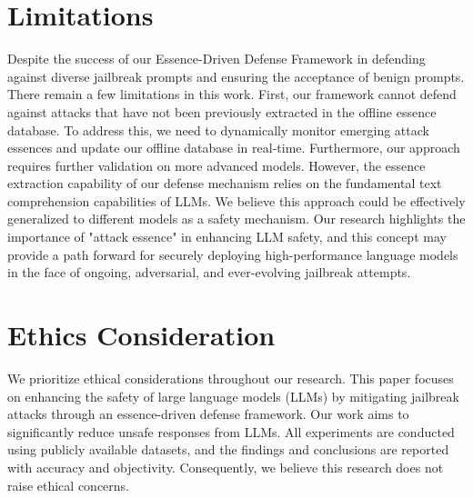 \newpage

\section*{Limitations}
Despite the success of our Essence-Driven Defense Framework in defending against diverse jailbreak prompts and ensuring the acceptance of benign prompts. There remain a few limitations in this work. First, our framework cannot defend against attacks that have not been previously extracted in the offline essence database. To address this, we need to dynamically monitor emerging attack essences and update our offline database in real-time. Furthermore, our approach requires further validation on more advanced models. However, the essence extraction capability of our defense mechanism relies on the fundamental text comprehension capabilities of LLMs. We believe this approach could be effectively generalized to different models as a safety mechanism. Our research highlights the importance of "attack essence" in enhancing LLM safety, and this concept may provide a path forward for securely deploying high-performance language models in the face of ongoing, adversarial, and ever-evolving jailbreak attempts.

\section*{Ethics Consideration}
We prioritize ethical considerations throughout our research. This paper focuses on enhancing the safety of large language models (LLMs) by mitigating jailbreak attacks through an essence-driven defense framework. Our work aims to significantly reduce unsafe responses from LLMs. All experiments are conducted using publicly available datasets, and the findings and conclusions are reported with accuracy and objectivity. Consequently, we believe this research does not raise ethical concerns.
